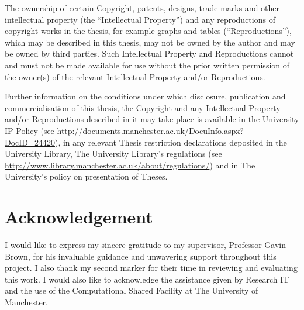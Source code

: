 \documentclass{article}
\begin{document}
The ownership of certain Copyright, patents, designs, trade marks and other intellectual property (the ``Intellectual Property'') and any reproductions of copyright works in the thesis, for example graphs and tables (``Reproductions''), which may be described in this thesis, may not be owned by the author and may be owned by third parties. Such Intellectual Property and Reproductions cannot and must not be made available for use without the prior written permission of the owner(s) of the relevant Intellectual Property and/or Reproductions. 

Further information on the conditions under which disclosure, publication and commercialisation of this thesis, the Copyright and any Intellectual Property and/or Reproductions described in it may take place is available in the University IP Policy (see \href{http://documents.manchester.ac.uk/DocuInfo.aspx?DocID=24420}{http://documents.manchester.ac.uk/DocuInfo.aspx?DocID=24420}), in any relevant Thesis restriction declarations deposited in the University Library, The University Library's regulations (see \href{http://www.library.manchester.ac.uk/about/regulations/}{http://www.library.manchester.ac.uk/about/regulations/}) and in The University's policy on presentation of Theses. 


\section*{Acknowledgement}
I would like to express my sincere gratitude to my supervisor, Professor Gavin Brown, for his invaluable guidance and unwavering support throughout this project. I also thank my second marker for their time in reviewing and evaluating this work. 
I would also like to acknowledge the assistance given by Research IT and the use of the Computational Shared Facility at The University of Manchester. 





\setcounter{section}{0}















\end{document}

